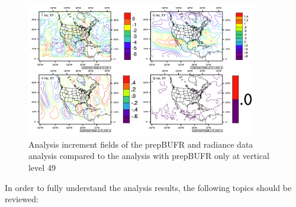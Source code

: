\begin{figure}[h!]
  \centering
  \includegraphics[width=0.9\textwidth]{images/increments_rad2}
  \caption{Analysis increment fields of the prepBUFR and radiance data analysis compared to the analysis with prepBUFR only at vertical level 49}
  \label{fig:increments_rad2}
\end{figure}

In order to fully understand the analysis results, the following topics should be reviewed:


